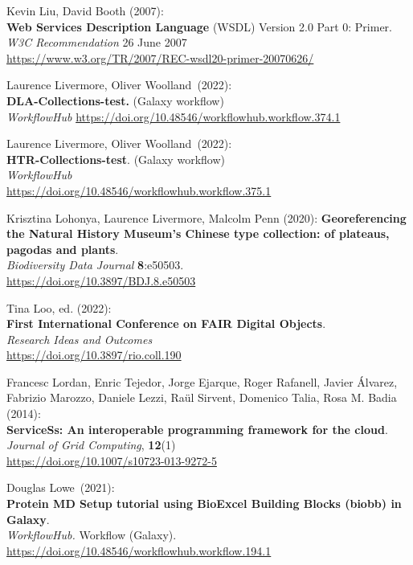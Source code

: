 \begin{thebibliography}{9}
Kevin Liu, David Booth (2007): \\
\textbf{Web Services Description Language} (WSDL) Version 2.0
Part 0: Primer. \\
\emph{W3C Recommendation} 26 June 2007 \\
\url{https://www.w3.org/TR/2007/REC-wsdl20-primer-20070626/}

Laurence Livermore, Oliver Woolland~(2022):\\
\textbf{DLA-Collections-test.} (Galaxy workflow)\\
\emph{WorkflowHub}
\url{https://doi.org/10.48546/workflowhub.workflow.374.1}

Laurence Livermore, Oliver Woolland~(2022):\\
\textbf{HTR-Collections-test}. (Galaxy workflow)\\
\emph{WorkflowHub}\\
\url{https://doi.org/10.48546/workflowhub.workflow.375.1}

Krisztina Lohonya, Laurence Livermore, Malcolm Penn (2020):
\textbf{Georeferencing the Natural History Museum's Chinese type collection: of plateaus,
pagodas and plants}.\\
\emph{Biodiversity Data Journal} \textbf{8}:e50503.\\
\url{https://doi.org/10.3897/BDJ.8.e50503}


Tina Loo, ed. (2022): \\
\textbf{First International Conference on FAIR Digital Objects}.\\
\emph{Research Ideas and Outcomes}\\
\url{https://doi.org/10.3897/rio.coll.190}

Francesc Lordan, Enric Tejedor, Jorge Ejarque, Roger
Rafanell, Javier Álvarez, Fabrizio Marozzo, Daniele Lezzi, Raül Sirvent,
Domenico Talia, Rosa M. Badia (2014):\\
\textbf{ServiceSs: An interoperable programming framework for the
cloud}.\\
\emph{Journal of Grid Computing}, \textbf{12}(1)\\
\url{https://doi.org/10.1007/s10723-013-9272-5}

Douglas Lowe~(2021):\\
\textbf{Protein MD Setup tutorial using BioExcel Building Blocks (biobb)
in Galaxy}.\\
\emph{WorkflowHub.} Workflow (Galaxy).\\
\url{https://doi.org/10.48546/workflowhub.workflow.194.1}


\end{thebibliography}
